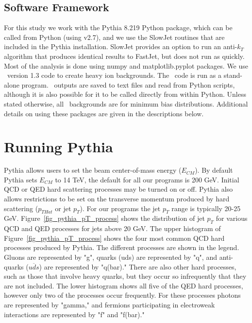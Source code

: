 \documentclass[11pt]{article}
\begin{document}
\subsection*{Software Framework}

For this study we work with the Pythia 8.219 Python package, which can be called from Python (using v2.7), and we use the SlowJet routines that are included in the Pythia installation.  SlowJet provides an option to run an anti-$k_T$ algorithm that produces identical results to FastJet, but does not run as quickly.  Most of the analysis is done using numpy and matplotlib.pyplot packages.  We use \trento\ version 1.3 code to create heavy ion backgrounds. The \trento\ code is run as a stand-alone program.  \trento\ outputs are saved to text files and read from Python scripts, although it is also possible for it to be called directly from within Python.  Unless stated otherwise, all \trento\ backgrounds are for minimum bias distributions.  Additional details on using these packages are given in the descriptions below.

\section{Running Pythia}
%
%
Pythia allows users to set the beam center-of-mass energy ($E_{CM}$). By default Pythia sets $E_{CM}$ to 14 TeV, the default for all our programs is 200 GeV.  Initial QCD or QED hard scattering processes may be turned on or off. Pythia also allows restrictions to be set on the transverse momentum produced by hard scattering ($p_{THat}$ or jet $p_T$). For our programs the jet $p_T$ range is typically 20-25 GeV. Figure~\ref{fig_pythia_pT_process} shows the distribution of jet $p_T$ for various QCD and QED processes for jets above 20 GeV. The upper histogram of Figure~\ref{fig_pythia_pT_process} shows the four most common QCD hard processes produced by Pythia. The different processes are shown in the legend. Gluons are represented by "g", quarks (uds) are represented by "q", and anti-quarks ($\overline{uds}$) are represented by "q(bar)." There are also other hard processes, such as those that involve heavy quarks, but they occur so infrequently that they are not included. The lower histogram shows all five of the QED hard processes, however only two of the processes occur frequently. For these processes photons are represented by "gamma," and fermions participating in electroweak interactions are represented by "f" and "f(bar)."
\end{document}
